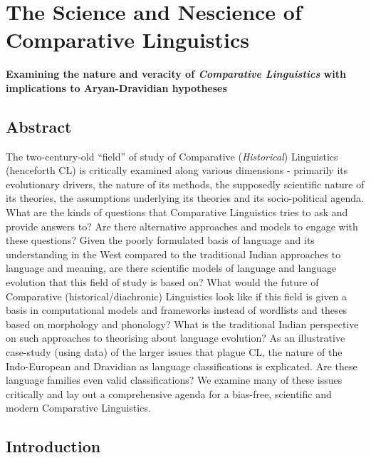 
\chapter{The Science and Nescience of Comparative Linguistics}\label{chap06}

\begin{center}
\textbf{Examining the nature and veracity of \textit{Comparative Linguistics} with implications to Aryan-Dravidian hypotheses}
\end{center}



\section*{Abstract}

The two-century-old “field” of study of Comparative (\textit{Historical}) Linguistics (henceforth CL) is critically examined along various dimensions - primarily its evolutionary drivers, the nature of its methods, the supposedly scientific nature of its theories, the assumptions underlying its theories and its socio-political agenda. What are the kinds of questions that Comparative Linguistics tries to ask and provide answers to? Are there alternative approaches and models to engage with these questions? Given the poorly formulated basis of language and its understanding in the West compared to the traditional Indian approaches to language and meaning, are there scientific models of language and language evolution that this field of study is based on? What would the future of Comparative (historical/diachronic) Linguistics look like if this field is given a basis in computational models and frameworks instead of wordlists and theses based on morphology and phonology? What is the traditional Indian perspective on such approaches to theorising about language evolution? As an illustrative case-study (using data) of the larger issues that plague CL, the nature of the Indo-European and Dravidian as language classifications is explicated. Are these language families even valid classifications? We examine many of these issues critically and lay out a comprehensive agenda for a bias-free, scientific and modern Comparative Linguistics.


\section*{Introduction}

